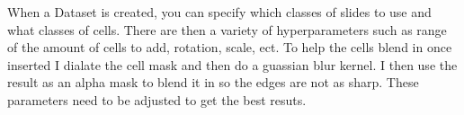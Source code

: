 \documentclass[ms,electronic,oneside,twosidetoc,letterpaper,chaptercenter,parttop]{byumsphd}
\begin{document}
When a Dataset is created, you can specify which classes of slides to use and what classes of cells.
There are then a variety of hyperparameters such as range of the amount of cells to add, rotation, scale, ect.
To help the cells blend in once inserted I dialate the cell mask and then do a guassian blur kernel. I then use
the result as an alpha mask to blend it in so the edges are not as sharp. These parameters need to be adjusted to
get the best resuts.

\begin{figure}[H]
  \centering
   \quad

   \quad


\end{figure}
\end{document}
